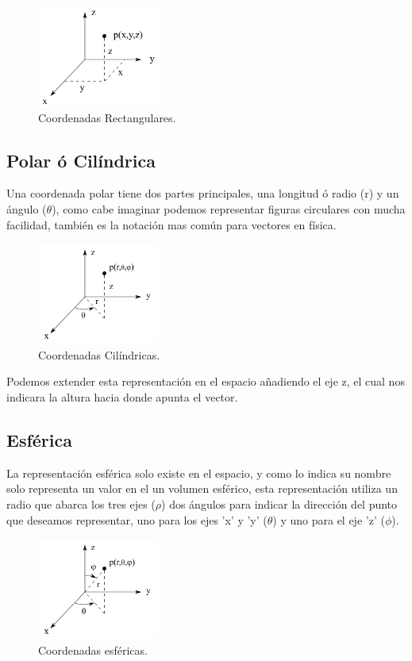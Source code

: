 \documentclass{article}
\begin{document}
\begin{figure}[htbp]
\centering
\includegraphics[width=4cm]{img/coordenadas-cartesianas.png}
\caption{Coordenadas Rectangulares.}
\end{figure}

\subsection{Polar ó Cilíndrica}
\label{sec:orgc31a4a8}
Una coordenada polar tiene dos partes principales, una longitud ó radio (r) y un ángulo (\(\theta\)), como cabe imaginar podemos representar figuras circulares con mucha facilidad, también es la notación mas común para vectores en física.

\begin{figure}[htbp]
\centering
\includegraphics[width=4cm]{img/coordenadas-cilindricas.png}
\caption{Coordenadas Cilíndricas.}
\end{figure}

Podemos extender esta representación en el espacio añadiendo el eje z, el cual nos indicara la altura hacia donde apunta el vector.

\subsection{Esférica}
\label{sec:org3b9633e}
La representación esférica solo existe en el espacio, y como lo indica su nombre solo representa un valor en el un volumen esférico, esta representación utiliza un radio que abarca los tres ejes (\(\rho\)) dos ángulos para indicar la dirección del punto que deseamos representar, uno para los ejes 'x' y 'y' (\(\theta\)) y uno para el eje 'z' (\(\phi\)).

\begin{figure}[htbp]
\centering
\includegraphics[width=4cm]{img/coordenadas-esfericas.png}
\caption{Coordenadas esféricas.}
\end{figure}
\end{document}
